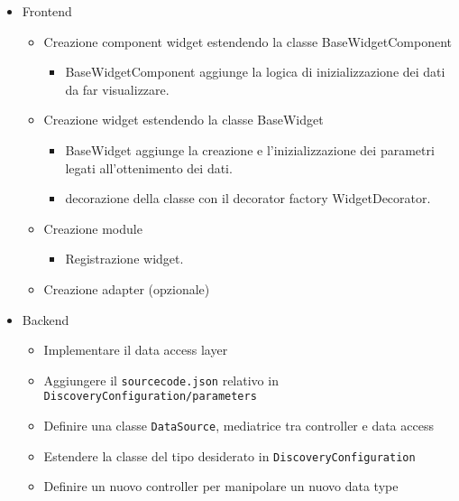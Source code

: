 \begin{itemize}
    \item Frontend
\begin{itemize}
    \item Creazione component widget estendendo la classe BaseWidgetComponent
    \begin{itemize}
        \item BaseWidgetComponent aggiunge la logica di inizializzazione dei dati da far visualizzare.
    \end{itemize}
    \item Creazione widget estendendo la classe BaseWidget
    \begin{itemize}
        \item BaseWidget aggiunge la creazione e l'inizializzazione dei parametri legati all'ottenimento dei dati.
        \item decorazione della classe con il decorator factory WidgetDecorator.
    \end{itemize}
    \item Creazione module
    \begin{itemize}
        \item Registrazione widget.
    \end{itemize}
    \item Creazione adapter (opzionale)
\end{itemize}
\item Backend
\begin{itemize}
	\item Implementare il data access layer
	\item Aggiungere il \verb|sourcecode.json| relativo in \verb|DiscoveryConfiguration/parameters|
	\item Definire una classe \verb|DataSource|, mediatrice tra controller e data access
	\item Estendere la classe del tipo desiderato in \verb|DiscoveryConfiguration|
	\item Definire un nuovo controller per manipolare un nuovo data type
\end{itemize}
\end{itemize}